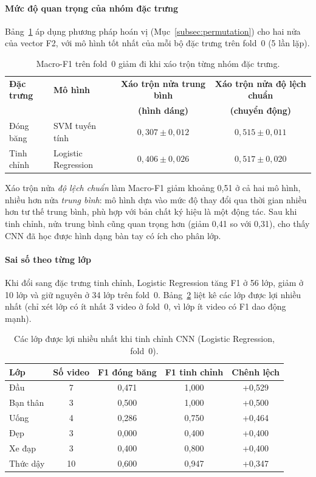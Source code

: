 \paragraph*{Mức độ quan trọng của nhóm đặc trưng} Bảng~\ref{tab:res_perm} áp dụng phương pháp hoán vị (Mục~\ref{subsec:permutation}) cho hai nửa của vector F2, với mô hình tốt nhất của mỗi bộ đặc trưng trên fold~0 (5 lần lặp).

\begin{table}[H]
  \centering
  \caption{Macro-F1 trên fold~0 giảm đi khi xáo trộn từng nhóm đặc trưng.}
  \label{tab:res_perm}
  \begin{tabular}{@{}llcc@{}}
    \toprule
    \textbf{Đặc trưng} & \textbf{Mô hình} & \textbf{Xáo trộn nửa trung bình} & \textbf{Xáo trộn nửa độ lệch chuẩn} \\
    & & \textbf{(hình dáng)} & \textbf{(chuyển động)} \\
    \midrule
    Đóng băng & SVM tuyến tính & $0{,}307\pm0{,}012$ & $0{,}515\pm0{,}011$ \\
    Tinh chỉnh & Logistic Regression & $0{,}406\pm0{,}026$ & $0{,}517\pm0{,}020$ \\
    \bottomrule
  \end{tabular}
\end{table}

Xáo trộn nửa \emph{độ lệch chuẩn} làm Macro-F1 giảm khoảng 0,51 ở cả hai mô hình, nhiều hơn nửa \emph{trung bình}: mô hình dựa vào mức độ thay đổi qua thời gian nhiều hơn tư thế trung bình, phù hợp với bản chất ký hiệu là một động tác. Sau khi tinh chỉnh, nửa trung bình cũng quan trọng hơn (giảm 0,41 so với 0,31), cho thấy CNN đã học được hình dạng bàn tay có ích cho phân lớp.

\paragraph*{Sai số theo từng lớp} Khi đổi sang đặc trưng tinh chỉnh, Logistic Regression tăng F1 ở 56 lớp, giảm ở 10 lớp và giữ nguyên ở 34 lớp trên fold~0. Bảng~\ref{tab:res_perclass} liệt kê các lớp được lợi nhiều nhất (chỉ xét lớp có ít nhất 3 video ở fold~0, vì lớp ít video có F1 dao động mạnh).

\begin{table}[H]
  \centering
  \caption{Các lớp được lợi nhiều nhất khi tinh chỉnh CNN (Logistic Regression, fold~0).}
  \label{tab:res_perclass}
  \small
  \begin{tabular}{@{}lcccc@{}}
    \toprule
    \textbf{Lớp} & \textbf{Số video} & \textbf{F1 đóng băng} & \textbf{F1 tinh chỉnh} & \textbf{Chênh lệch} \\
    \midrule
    Đầu & 7 & 0,471 & 1,000 & +0,529 \\
    Bạn thân & 3 & 0,500 & 1,000 & +0,500 \\
    Uống & 4 & 0,286 & 0,750 & +0,464 \\
    Đẹp & 3 & 0,000 & 0,400 & +0,400 \\
    Xe đạp & 3 & 0,400 & 0,800 & +0,400 \\
    Thức dậy & 10 & 0,600 & 0,947 & +0,347 \\
    \bottomrule
  \end{tabular}
\end{table}

